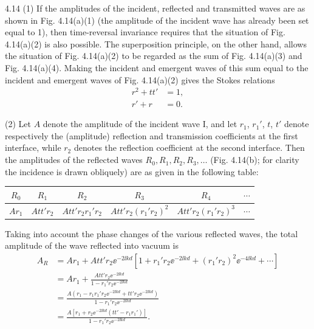 \begin{solution}{4.14}
(1) If the amplitudes of the incident, reflected and transmitted waves are as shown in
Fig. 4.14(a)(1) (the amplitude of the incident wave has already been set equal to 1), then
time-reversal invariance requires that the situation of Fig. 4.14(a)(2) is also possible. The
superposition principle, on the other hand, allows the situation of Fig. 4.14(a)(2) to be
regarded as the sum of Fig. 4.14(a)(3) and Fig. 4.14(a)(4). Making the incident and emergent
waves of this sum equal to the incident and emergent waves of Fig. 4.14(a)(2) gives the Stokes
relations
\begin{align*}
r^2 + tt' &= 1,\\
r' + r &= 0.
\end{align*}

(2) Let $A$ denote the amplitude of the incident wave I, and let $r_1$, $r_1'$, $t$, $t'$
denote respectively the (amplitude) reflection and transmission coefficients at the first
interface, while $r_2$ denotes the reflection coefficient at the second interface. Then the
amplitudes of the reflected waves $R_0, R_1, R_2, R_3, \ldots$ (Fig. 4.14(b); for clarity the
incidence is drawn obliquely) are as given in the following table:

\begin{center}
\renewcommand{\arraystretch}{1.35}
\begin{tabular}{cccccc}
$R_0$ & $R_1$ & $R_2$ & $R_3$ & $R_4$ & $\cdots$\\ \hline
$Ar_1$ & $Att'r_2$ & $Att'r_2r_1'r_2$ & $Att'r_2(r_1'r_2)^2$ & $Att'r_2(r_1'r_2)^3$ & $\cdots$
\end{tabular}
\end{center}

Taking into account the phase changes of the various reflected waves, the total amplitude of the
wave reflected into vacuum is
\begin{align*}
A_R &= Ar_1 + Att'r_2\ee^{-2\ii kd}\left[1 + r_1'r_2\ee^{-2\ii kd}
      + (r_1'r_2)^2\ee^{-4\ii kd} + \cdots\right]\\
    &= Ar_1 + \frac{Att'r_2\ee^{-2\ii kd}}{1 - r_1'r_2\ee^{-2\ii kd}}\\
    &= \frac{A\left(r_1 - r_1r_1'r_2\ee^{-2\ii kd} + tt'r_2\ee^{-2\ii kd}\right)}
            {1 - r_1'r_2\ee^{-2\ii kd}}\\
    &= \frac{A\left[r_1 + r_2\ee^{-2\ii kd}(tt' - r_1r_1')\right]}
            {1 - r_1'r_2\ee^{-2\ii kd}} .
\end{align*}


\end{solution}
